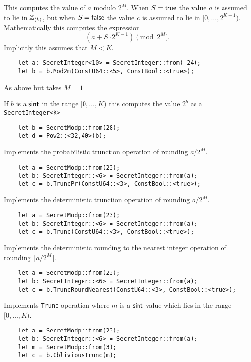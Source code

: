 This computes the value of $a$ modulo $2^M$.
When $S={\mathsf{true}}$ the value $a$ is assumed to lie in ${\mathbb{Z}}_{\langle k \rangle}$,
but when $S={\mathsf{false}}$ the value $a$ is assumed to lie in $[0,\ldots,2^{K-1})$.
Mathematically this computes the expression
\[  \left( a + S \cdot 2^{K-1} \right) \pmod 2^M. \]
Implicitly this assumes that $M < K$.
\begin{lstlisting}
    let a: SecretInteger<10> = SecretInteger::from(-24);
    let b = b.Mod2m(ConstU64::<5>, ConstBool::<true>);
\end{lstlisting}

As above but takes $M=1$.

If $b$ is a $\mathsf{sint}$ in the range $[0,\ldots,K)$ this computes
the value $2^b$ as a \verb|SecretInteger<K>|
\begin{lstlisting}
    let b = SecretModp::from(28);
    let d = Pow2::<32,40>(b);
\end{lstlisting}

Implements the probabilistic trunction operation of rounding $a/2^M$.
\begin{lstlisting}
    let a = SecretModp::from(23);
    let b: SecretInteger::<6> = SecretInteger::from(a);
    let c = b.TruncPr(ConstU64::<3>, ConstBool::<true>);
\end{lstlisting}

Implements the deterministic trunction operation of rounding $a/2^M$.
\begin{lstlisting}
    let a = SecretModp::from(23);
    let b: SecretInteger::<6> = SecretInteger::from(a);
    let c = b.Trunc(ConstU64::<3>, ConstBool::<true>);
\end{lstlisting}

Implements the deterministic rounding to the nearest integer operation
of rounding $\lceil a/2^M \rfloor$.
\begin{lstlisting}
    let a = SecretModp::from(23);
    let b: SecretInteger::<6> = SecretInteger::from(a);
    let c = b.TruncRoundNearest(ConstU64::<3>, ConstBool::<true>);
\end{lstlisting}

Implements \verb|Trunc| operation where $m$ is a $\mathsf{sint}$ value
which lies in the range $[0,\ldots,K)$.
\begin{lstlisting}
    let a = SecretModp::from(23);
    let b: SecretInteger::<6> = SecretInteger::from(a);
    let m = SecretModp::from(3);
    let c = b.ObliviousTrunc(m);
\end{lstlisting}

